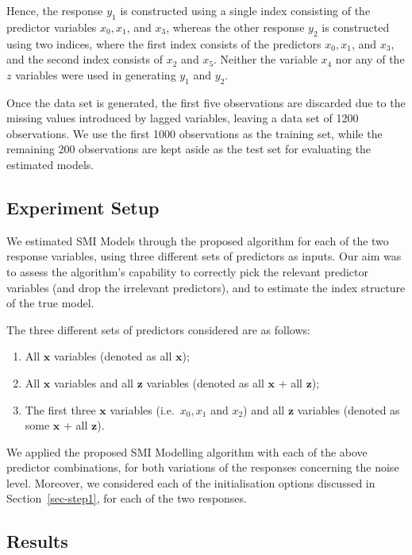 \documentclass[
  11pt,
  a4paper,
]{article}
\providecommand{\tightlist}{%
  \setlength{\itemsep}{0pt}\setlength{\parskip}{0pt}}\usepackage{longtable,booktabs,array}
\begin{document}
Hence, the response \(y_{1}\) is constructed using a single index
consisting of the predictor variables \(x_{0}, x_{1}\), and \(x_{3}\),
whereas the other response \(y_{2}\) is constructed using two indices,
where the first index consists of the predictors \(x_{0}, x_{1}\), and
\(x_{3}\), and the second index consists of \(x_{2}\) and \(x_{5}\).
Neither the variable \(x_{4}\) nor any of the \(z\) variables were used
in generating \(y_{1}\) and \(y_{2}\).

Once the data set is generated, the first five observations are
discarded due to the missing values introduced by lagged variables,
leaving a data set of 1200 observations. We use the first 1000
observations as the training set, while the remaining 200 observations
are kept aside as the test set for evaluating the estimated models.

\subsection{Experiment Setup}\label{sec-exp}

We estimated SMI Models through the proposed algorithm for each of the
two response variables, using three different sets of predictors as
inputs. Our aim was to assess the algorithm's capability to correctly
pick the relevant predictor variables (and drop the irrelevant
predictors), and to estimate the index structure of the true model.

The three different sets of predictors considered are as follows:

\begin{enumerate}
\def\labelenumi{\arabic{enumi}.}
\tightlist
\item
  All \(\bm{x}\) variables (denoted as all \(\bm{x}\));
\item
  All \(\bm{x}\) variables and all \(\bm{z}\) variables (denoted as all
  \(\bm{x}\) + all \(\bm{z}\));
\item
  The first three \(\bm{x}\) variables (i.e.~\(x_{0}, x_{1}\) and
  \(x_{2}\)) and all \(\bm{z}\) variables (denoted as some \(\bm{x}\) +
  all \(\bm{z}\)).
\end{enumerate}

We applied the proposed SMI Modelling algorithm with each of the above
predictor combinations, for both variations of the responses concerning
the noise level. Moreover, we considered each of the initialisation
options discussed in Section~\ref{sec-step1}, for each of the two
responses.

\subsection{Results}\label{sec-sim-results}
\end{document}
